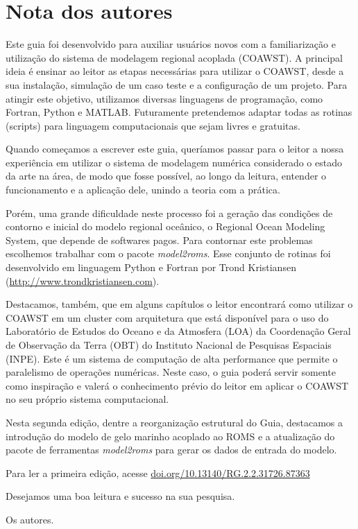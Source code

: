 \chapter*{Nota dos autores}

\noindent Este guia foi desenvolvido para auxiliar usuários novos com a familiarização e utilização do sistema 
          de modelagem regional acoplada (COAWST). A principal ideia é ensinar ao leitor as etapas necessárias 
          para utilizar o COAWST, desde a sua instalação, simulação de um caso teste e a configuração de um 
          projeto. Para atingir este objetivo, utilizamos diversas linguagens de programação, como Fortran, 
          Python e MATLAB. Futuramente pretendemos adaptar todas as rotinas (scripts) para linguagem computacionais 
          que sejam livres e gratuitas.
\bigskip

\noindent Quando começamos a escrever este guia, queríamos passar para o leitor a nossa experiência em utilizar o 
          sistema de modelagem numérica considerado o estado da arte na área, de modo que fosse possível, ao longo 
          da leitura, entender o funcionamento e a aplicação dele, unindo a teoria com a prática.
\bigskip

\noindent Porém, uma grande dificuldade neste processo foi a geração das condições de contorno e inicial do modelo 
          regional oceânico, o Regional Ocean Modeling System, que depende de softwares pagos. Para contornar este 
          problemas escolhemos trabalhar com o pacote \textit{model2roms}. Esse conjunto de rotinas foi desenvolvido 
          em linguagem Python e Fortran por Trond Kristiansen 
          (\textcolor{bleu_cite}{\href{http://www.trondkristiansen.com}{http://www.trondkristiansen.com}}).
\bigskip

\noindent Destacamos, também, que em alguns capítulos o leitor encontrará como utilizar o COAWST em um cluster com
          arquitetura que está disponível para o uso do Laboratório de Estudos do Oceano e da Atmosfera (LOA) da Coordenação
          Geral de Observação da Terra (OBT) do Instituto Nacional de Pesquisas Espaciais (INPE). Este é um sistema de 
          computação de alta performance que permite o paralelismo de operações numéricas. Neste caso, o guia poderá servir 
          somente como inspiração e valerá o conhecimento prévio do leitor em aplicar o COAWST no seu próprio sistema computacional.
\bigskip

\noindent Nesta segunda edição, dentre a reorganização estrutural do Guia, destacamos a introdução do modelo
          de gelo marinho acoplado ao ROMS e a atualização do pacote de ferramentas \textit{model2roms} para gerar os 
          dados de entrada do modelo.
\bigskip

\noindent Para ler a primeira edição, acesse \textcolor{bleu_cite}{\href{doi.org/10.13140/RG.2.2.31726.87363}{doi.org/10.13140/RG.2.2.31726.87363}}
\bigskip

\noindent Desejamos uma boa leitura e sucesso na sua pesquisa.
\begin{flushright}
\noindent Os autores.
\end{flushright}
